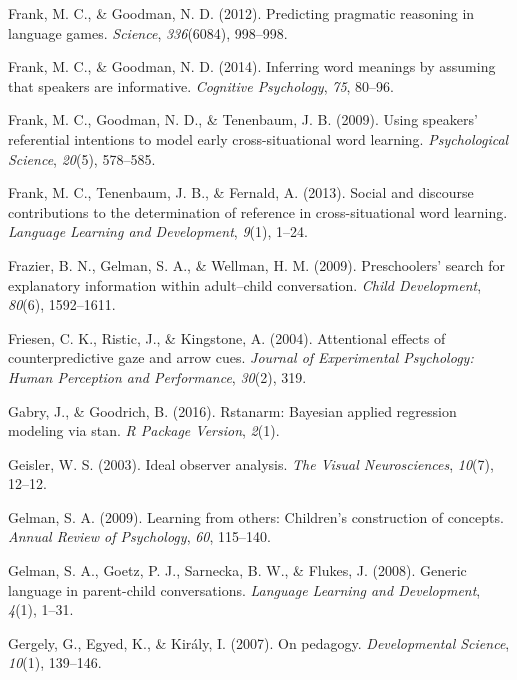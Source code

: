 \documentclass[oneside]{report}
\begin{document}
\hypertarget{ref-frank2012predicting}{}
Frank, M. C., \& Goodman, N. D. (2012). Predicting pragmatic reasoning
in language games. \emph{Science}, \emph{336}(6084), 998--998.

\hypertarget{ref-frank2014inferring}{}
Frank, M. C., \& Goodman, N. D. (2014). Inferring word meanings by
assuming that speakers are informative. \emph{Cognitive Psychology},
\emph{75}, 80--96.

\hypertarget{ref-frank2009using}{}
Frank, M. C., Goodman, N. D., \& Tenenbaum, J. B. (2009). Using
speakers' referential intentions to model early cross-situational word
learning. \emph{Psychological Science}, \emph{20}(5), 578--585.

\hypertarget{ref-frank2013social}{}
Frank, M. C., Tenenbaum, J. B., \& Fernald, A. (2013). Social and
discourse contributions to the determination of reference in
cross-situational word learning. \emph{Language Learning and
Development}, \emph{9}(1), 1--24.

\hypertarget{ref-frazier2009preschoolers}{}
Frazier, B. N., Gelman, S. A., \& Wellman, H. M. (2009). Preschoolers'
search for explanatory information within adult--child conversation.
\emph{Child Development}, \emph{80}(6), 1592--1611.

\hypertarget{ref-friesen2004attentional}{}
Friesen, C. K., Ristic, J., \& Kingstone, A. (2004). Attentional effects
of counterpredictive gaze and arrow cues. \emph{Journal of Experimental
Psychology: Human Perception and Performance}, \emph{30}(2), 319.

\hypertarget{ref-gabry2016rstanarm}{}
Gabry, J., \& Goodrich, B. (2016). Rstanarm: Bayesian applied regression
modeling via stan. \emph{R Package Version}, \emph{2}(1).

\hypertarget{ref-geisler2003ideal}{}
Geisler, W. S. (2003). Ideal observer analysis. \emph{The Visual
Neurosciences}, \emph{10}(7), 12--12.

\hypertarget{ref-gelman2009learning}{}
Gelman, S. A. (2009). Learning from others: Children's construction of
concepts. \emph{Annual Review of Psychology}, \emph{60}, 115--140.

\hypertarget{ref-gelman2008generic}{}
Gelman, S. A., Goetz, P. J., Sarnecka, B. W., \& Flukes, J. (2008).
Generic language in parent-child conversations. \emph{Language Learning
and Development}, \emph{4}(1), 1--31.

\hypertarget{ref-gergely2007pedagogy}{}
Gergely, G., Egyed, K., \& Király, I. (2007). On pedagogy.
\emph{Developmental Science}, \emph{10}(1), 139--146.
\end{document}
